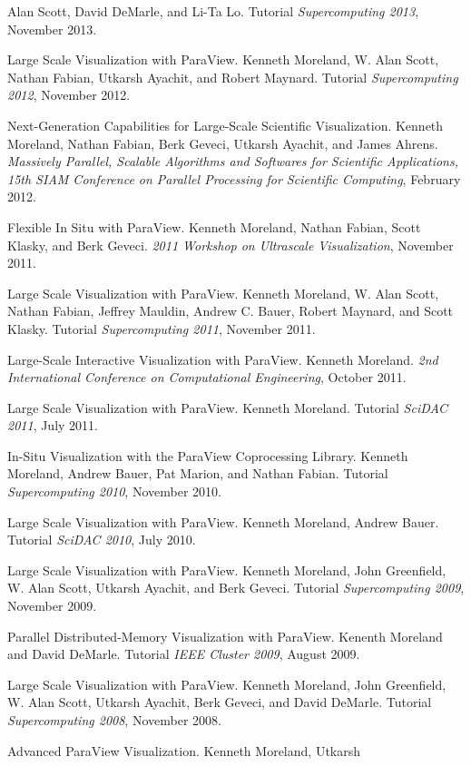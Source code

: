\documentclass{article}
\begin{document}
\begin{enumerate}[label={[\arabic*]}]
  Alan Scott, David DeMarle, and Li-Ta Lo. Tutorial
  \emph{Supercomputing 2013}, November 2013.
\item Large Scale Visualization with ParaView. Kenneth Moreland,
  W. Alan Scott, Nathan Fabian, Utkarsh Ayachit, and Robert
  Maynard. Tutorial \emph{Supercomputing 2012}, November 2012.
\item Next-Generation Capabilities for Large-Scale Scientific
  Visualization. Kenneth Moreland, Nathan Fabian, Berk Geveci, Utkarsh
  Ayachit, and James Ahrens. \emph{Massively Parallel, Scalable
    Algorithms and Softwares for Scientific Applications, 15th SIAM
    Conference on Parallel Processing for Scientific Computing},
  February 2012.
\item Flexible In Situ with ParaView. Kenneth Moreland, Nathan Fabian,
  Scott Klasky, and Berk Geveci. \emph{2011 Workshop on Ultrascale
    Visualization}, November 2011.
\item Large Scale Visualization with ParaView. Kenneth Moreland,
  W. Alan Scott, Nathan Fabian, Jeffrey Mauldin, Andrew C. Bauer,
  Robert Maynard, and Scott Klasky. Tutorial \emph{Supercomputing
    2011}, November 2011.
\item Large-Scale Interactive Visualization with ParaView. Kenneth
  Moreland. \emph{2nd International Conference on Computational
    Engineering}, October 2011.
\item Large Scale Visualization with ParaView. Kenneth
  Moreland. Tutorial \emph{SciDAC 2011}, July 2011.
\item In-Situ Visualization with the ParaView Coprocessing Library.
  Kenneth Moreland, Andrew Bauer, Pat Marion, and Nathan
  Fabian. Tutorial \emph{Supercomputing 2010}, November 2010.
\item Large Scale Visualization with ParaView. Kenneth Moreland,
  Andrew Bauer. Tutorial \emph{SciDAC 2010}, July 2010.
\item Large Scale Visualization with ParaView. Kenneth Moreland, John
  Greenfield, W. Alan Scott, Utkarsh Ayachit, and Berk Geveci. Tutorial
  \emph{Supercomputing 2009}, November 2009.
\item Parallel Distributed-Memory Visualization with ParaView. Kenenth
  Moreland and David DeMarle. Tutorial \emph{IEEE Cluster 2009}, August
  2009.
\item Large Scale Visualization with ParaView. Kenneth Moreland, John
  Greenfield, W. Alan Scott, Utkarsh Ayachit, Berk Geveci, and David
  DeMarle. Tutorial \emph{Supercomputing 2008}, November 2008.
\item Advanced ParaView Visualization. Kenneth Moreland, Utkarsh

\end{enumerate}
\end{document}
